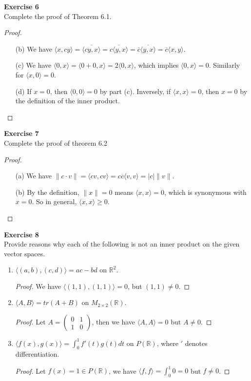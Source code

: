 \documentclass[12pt, a4paper]{article}
\theoremstyle{plain}
\newcommand{\R}{\mathbb{R}}
\newenvironment{exercise}[2][Exercise]
    { \begin{mdframed}[backgroundcolor=gray!20] \textbf{#1 #2} \\}
    {  \end{mdframed}}
\begin{document}
\begin{exercise}{6}
Complete the proof of Theorem 6.1.
\end{exercise}
	\begin{proof}
	\hfill
	\begin{enumerate}
	\item[(b)] We have $\langle{x,cy}\rangle=\overline{\langle{cy,x}\rangle}=\overline{c\langle{y,x}\rangle}=\overline{c}\overline{\langle{y,x}\rangle}=\overline{c}\langle{x,y}\rangle$.
	\item[(c)] We have $\langle{0,x}\rangle=\langle{0+0,x}\rangle=2\langle{0,x}\rangle$, which implies $\langle{0,x}\rangle=0$. Similarly for $\langle{x,0}\rangle=0$.
	\item[(d)] If $x=0$, then $\langle{0,0}\rangle=0$ by part (c). Inversely, if $\langle{x,x}\rangle=0$, then $x=0$ by the definition of the inner product.
	\end{enumerate}
	\end{proof}

\begin{exercise}{7}
Complete the proof of theorem 6.2
\end{exercise}
	\begin{proof}
	\hfill
	\begin{enumerate}
	\item[(a)] We have $\|c\cdot v\|=\langle{cv,cv}\rangle=c\overline{c}	\langle{v,v}\rangle=|c|\|v\|$.
	\item[(b)] By the definition, $\|x\|=0$ means $\langle{x,x}\rangle=0$, 	which is synonymous with $x=0$. So in general, $\langle{x,x}\rangle\geq 0$.
	\end{enumerate}
	\end{proof}

\begin{exercise}{8}
Provide reasons why each of the following is not an inner product on the given vector spaces.
\begin{enumerate}[label=(\alph*)]
\item $\langle{(a,b),(c,d)}\rangle=ac-bd$ on $\R^2$.
	\begin{proof}
	We have $\langle{(1,1),(1,1)}\rangle=0$, but $(1,1)\neq 0$.
	\end{proof}
\item $\langle{A,B}\rangle=tr(A+B)$ on $M_{2\times 2}(\R)$.
	\begin{proof}
	Let $A=\begin{pmatrix}
	0&1\\
	1&0
\end{pmatrix}$, then we have $\langle{A,A}\rangle=0$ but $A\neq 0$.
	\end{proof}
\item $\langle{f(x),g(x)}\rangle=\int_{0}^{1}{f'(t)g(t)}dt$ on $P(\R)$, where $'$ denotes differentiation.
	\begin{proof}
	Let $f(x)=1\in P(\R)$, we have $\langle{f,f}\rangle=\int_{0}^{1}{0}=0$ but $f\neq 0$. 
	\end{proof}
\end{enumerate}
\end{exercise}
\end{document}
